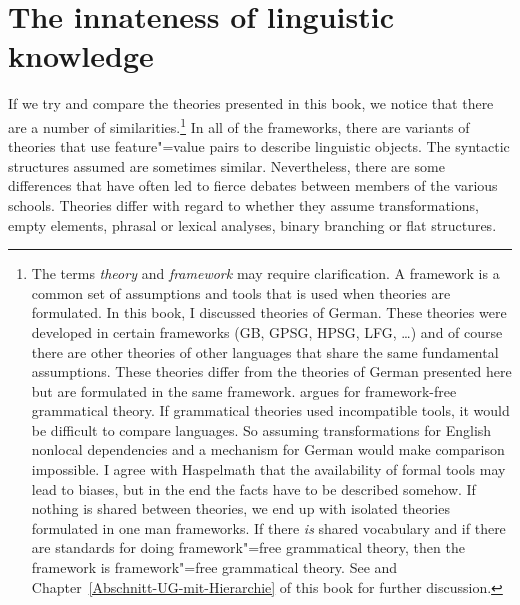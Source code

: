 %

\chapter{The innateness of linguistic knowledge}
\label{Abschnitt-Angeborenheit}\label{chap-innateness}
%


If we try and compare the theories presented in this book, we notice
that there are a number of similarities.\footnote{\label{fn-ffs}%
  The terms \emph{theory} and \emph{framework} may require clarification. A framework is a common
  set of assumptions and tools that is used when theories are formulated. In this book, I discussed
  theories of German. These theories were developed in certain frameworks (GB, GPSG, HPSG, LFG, \ldots) and of course there are
  other theories of other languages that share the same fundamental assumptions. These theories
  differ from the theories of German presented here but are formulated in the same
  framework. \citet{Haspelmath2010c} argues for framework-free grammatical theory. If grammatical
  theories used incompatible tools, it would be difficult to compare languages. So assuming
  transformations for English nonlocal dependencies and a \slasch mechanism for German would make
  comparison impossible. I agree with Haspelmath that the availability of formal tools may lead to
  biases, but in the end the facts have to be described somehow. If nothing is shared between
  theories, we end up with isolated theories formulated in one man frameworks. If there \emph{is} shared
  vocabulary and if there are standards for doing framework"=free grammatical theory, then the
  framework is framework"=free grammatical theory. See
  \citet{MuellerCoreGram} and Chapter~\ref{Abschnitt-UG-mit-Hierarchie} of this book for further discussion.
}
In all of the frameworks, there are variants of theories that use feature"=value pairs to describe linguistic objects.
The syntactic structures assumed are sometimes similar. Nevertheless, there are some differences that have often led to fierce debates
between members of the various schools. Theories differ with regard to whether they assume transformations, empty elements, phrasal or lexical analyses,
binary branching or flat structures.

